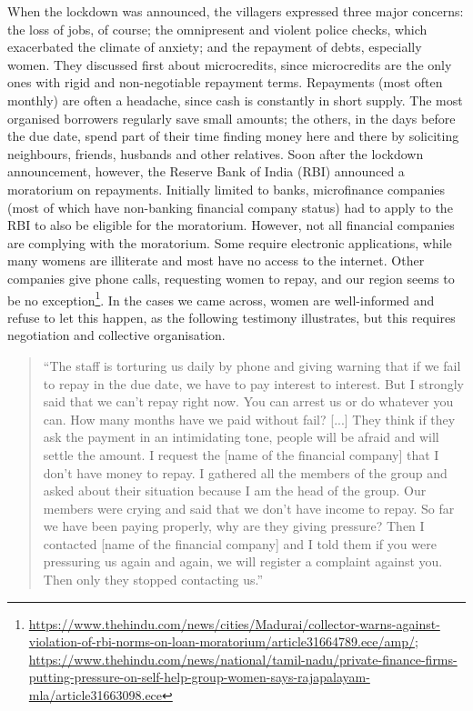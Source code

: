 \documentclass[a4paper, 11pt, onecolumn]{article}
\begin{document}
When the lockdown was announced, the villagers expressed three major concerns: the loss of jobs, of course; the omnipresent and violent police checks, which exacerbated the climate of anxiety; and the repayment of debts, especially women. 
They discussed first about microcredits, since microcredits are the only ones with rigid and non-negotiable repayment terms. 
Repayments (most often monthly) are often a headache, since cash is constantly in short supply. 
The most organised borrowers regularly save small amounts; the others, in the days before the due date, spend part of their time finding money here and there by soliciting neighbours, friends, husbands and other relatives. 
Soon after the lockdown announcement, however, the Reserve Bank of India (RBI) announced a moratorium on repayments. 
Initially limited to banks, microfinance companies (most of which have non-banking financial company status) had to apply to the RBI to also be eligible for the moratorium. 
However, not all financial companies are complying with the moratorium. 
Some require electronic applications, while many womens are illiterate and most have no access to the internet. 
Other companies give phone calls, requesting women to repay, and our region seems to be no exception\footnote{\url{https://www.thehindu.com/news/cities/Madurai/collector-warns-against-violation-of-rbi-norms-on-loan-moratorium/article31664789.ece/amp/}; \url{https://www.thehindu.com/news/national/tamil-nadu/private-finance-firms-putting-pressure-on-self-help-group-women-says-rajapalayam-mla/article31663098.ece}}.
In the cases we came across, women are well-informed and refuse to let this happen, as the following testimony illustrates, but this requires negotiation and collective organisation. 

\begin{quote}
``The staff is torturing us daily by phone and giving warning that if we fail to repay in the due date, we have to pay interest to interest. 
But I strongly said that we can’t repay right now. 
You can arrest us or do whatever you can. 
How many months have we paid without fail? [...] They think if they ask the payment in an intimidating tone, people will be afraid and will settle the amount. 
I request the [name of the financial company] that I don’t have money to repay. 
I gathered all the members of the group and asked about their situation because I am the head of the group. 
Our members were crying and said that we don’t have income to repay. 
So far we have been paying properly, why are they giving pressure? Then I contacted [name of the financial company] and I told them if you were pressuring us again and again, we will register a complaint against you. 
Then only they stopped contacting us.''
\end{quote}
\end{document}

